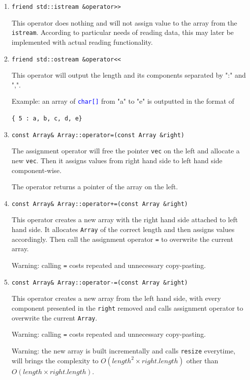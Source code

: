 \documentclass[11pt,a4paper]{article}
\newcommand{\ttype}[1]{\textcolor{blue}{\texttt{#1}}}
\theoremstyle{definition}
\theoremstyle{definition}
\numberwithin{equation}{section}
\begin{document}
	\begin{enumerate}
		\item \texttt{friend std::istream \&operator>>}
		
		This operator does nothing and will not assign value to the array from the \texttt{istream}. According to particular needs of reading data, this may later be implemented with actual reading functionality.
		
		\item \texttt{friend std::ostream \&operator<<}
		
		This operator will output the length and its components separated by ":" and ",".
		
		Example: an array of \ttype{char[]} from "a" to "e" is outputted in the format of
		
		\texttt{\{ 5 : a, b, c, d, e\}}
		
		\item \texttt{const Array\& Array::operator=(const Array \&right)}
		
		The assignment operator will free the pointer \texttt{vec} on the left and allocate a new \texttt{vec}. Then it assigns values from right hand side to left hand side component-wise. 
		
		The operator returns a pointer of the array on the left.
		
				
		\item \texttt{const Array\& Array::operator+=(const Array \&right)}
		
		This operator creates a new array with the right hand side attached to left hand side. It allocates \texttt{Array} of the correct length and then assigns values accordingly. Then call the assignment operator \texttt{=} to overwrite the current array.
		
		Warning: calling \texttt{=} costs repeated and unnecessary copy-pasting.
		
		\item \texttt{const Array\& Array::operator-=(const Array \&right)}
		
		This operator creates a new array from the left hand side, with every component presented in the \texttt{right} removed and calls assignment operator to overwrite the current \texttt{Array}.
		
		Warning: calling \texttt{=} costs repeated and unnecessary copy-pasting. 
		
		Warning: the new array is built incrementally and calls \texttt{resize} everytime, will brings the complexity to $O(length^2\times right.length)$ other than $O(length\times right.length)$.
		

\end{enumerate}
\end{document}
